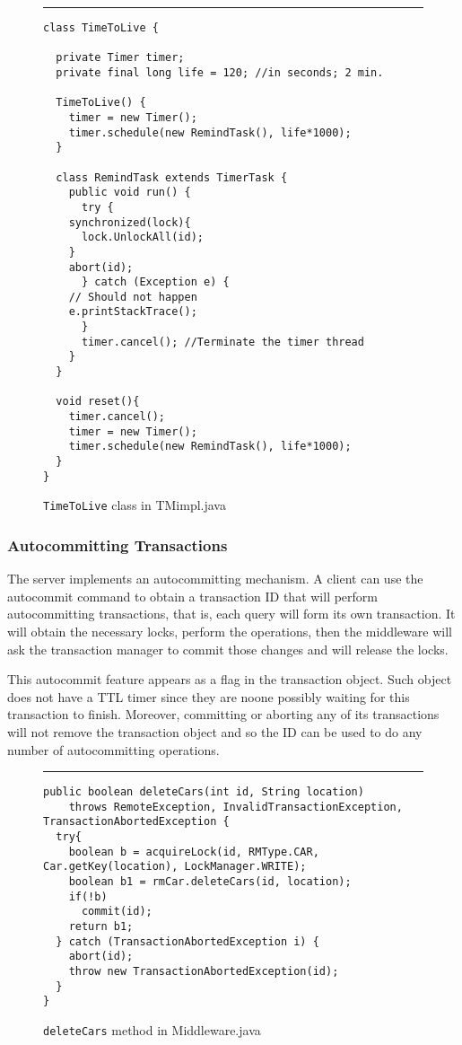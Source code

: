 \documentclass[12pt]{article}
\theoremstyle{plain}%
\theoremstyle{definition}
\theoremstyle{remark}
\newcommand{\java}[1]{{\lstinline!#1!}}
\newenvironment{figureone}[1]{%
  \def\deffigurecaption{#1}%
  \begin{figure}[htbp]%
  \begin{center}%
  \begin{minipage}{\columnwidth}%
  \hrule \vspace*{2ex}%
}{%
  \end{minipage}%
  \end{center}%
  \caption{\deffigurecaption}%
  \end{figure}%
}
\begin{document}
\begin{figureone}{\java{TimeToLive} class in TMimpl.java \label{fig:ttl}}
\begin{lstlisting}
class TimeToLive {

  private Timer timer;
  private final long life = 120; //in seconds; 2 min.
  
  TimeToLive() {
    timer = new Timer();
    timer.schedule(new RemindTask(), life*1000);
  }
  
  class RemindTask extends TimerTask {
    public void run() {
      try {
	synchronized(lock){
	  lock.UnlockAll(id);
	}
	abort(id);
      } catch (Exception e) {
	// Should not happen
	e.printStackTrace();
      }
      timer.cancel(); //Terminate the timer thread
    }
  }	
  
  void reset(){
    timer.cancel();
    timer = new Timer();
    timer.schedule(new RemindTask(), life*1000);
  }
}
\end{lstlisting}
\end{figureone}


\subsubsection{Autocommitting Transactions}

The server implements an autocommitting mechanism. A client can use the autocommit command to obtain a transaction ID that will perform autocommitting transactions, that is, each query will form its own transaction. It will obtain the necessary locks, perform the operations, then the middleware will ask the transaction manager to commit those changes and will release the locks. 

This autocommit feature appears as a flag in the transaction object. Such object does not have a TTL timer since they are noone possibly waiting for this transaction to finish. Moreover, committing or aborting any of its transactions will not remove the transaction object and so the ID can be used to do any number of autocommitting operations.  


\begin{figureone}{\java{deleteCars} method in Middleware.java \label{fig:operation}}
\begin{lstlisting}
public boolean deleteCars(int id, String location)
    throws RemoteException, InvalidTransactionException, TransactionAbortedException {
  try{
    boolean b = acquireLock(id, RMType.CAR, Car.getKey(location), LockManager.WRITE);
    boolean b1 = rmCar.deleteCars(id, location);
    if(!b)
      commit(id);
    return b1;
  } catch (TransactionAbortedException i) {
    abort(id);
    throw new TransactionAbortedException(id);
  }
}
\end{lstlisting}
\end{figureone}
\end{document}
